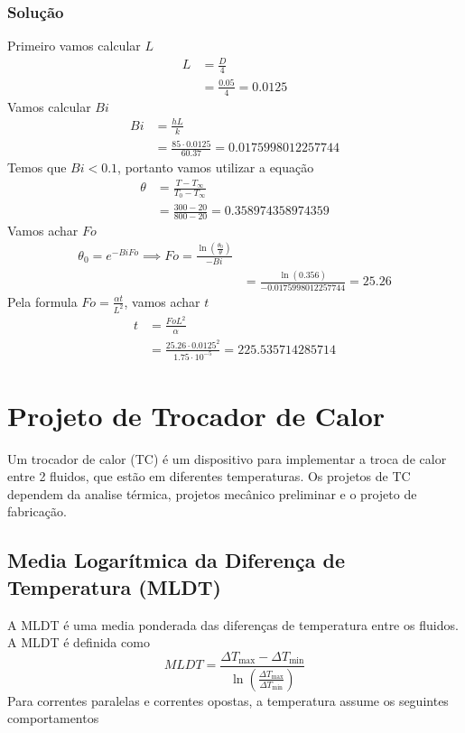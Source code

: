 \subsubsection{Solução}
Primeiro vamos calcular \(L\)
\begin{align}
    L &= \frac{D}{4}\\
    &= \frac{0.05}{4} = 0.0125  
\end{align}
Vamos calcular \(Bi\)
\begin{align}
    Bi &= \frac{h L}{k}\\
    &= \frac{85 \cdot 0.0125}{60.37} = 0.0175998012257744
\end{align}
Temos que \(Bi < 0.1\), portanto vamos utilizar a equação
\begin{align}
    \theta &= \frac{T - T_\infty}{T_0 - T_\infty}\\
    &= \frac{300 - 20}{800 - 20}  = 0.358974358974359
\end{align}
Vamos achar \(Fo\)
\begin{align}
    \theta_0 = e^{-Bi Fo} \implies Fo = \frac{\ln \left( \frac{\theta_0}{\theta} \right)}{-Bi}\\
    &= \frac{\ln  (0.356) }{-0.0175998012257744} = 25.26
\end{align}
Pela formula \(Fo = \frac{\alpha t}{L^{2} }\), vamos achar \(t\)
\begin{align}
    t &= \frac{Fo L^{2} }{\alpha}\\
    &= \frac{25.26 \cdot 0.0125^{2} }{1.75 \cdot 10^{-5} } = 225.535714285714
\end{align}
\section{Projeto de Trocador de Calor}
Um trocador de calor (TC) é um dispositivo para implementar a troca de calor entre 2 fluidos, que estão
em diferentes temperaturas. Os projetos de TC dependem da analise térmica, projetos mecânico
preliminar e o projeto de fabricação. \par

\subsection{Media Logarítmica da Diferença de Temperatura (MLDT)}
A MLDT é uma media ponderada das diferenças de temperatura entre os fluidos. A MLDT é definida como
\begin{equation}\label{eq: MLDT}
    MLDT = \frac{\Delta T_{\max } - \Delta T_{\min }}{\ln \left( \frac{\Delta T_{\max }}{\Delta T_{\min }} \right)} 
\end{equation}
Para correntes paralelas e correntes opostas, a temperatura assume os seguintes comportamentos
